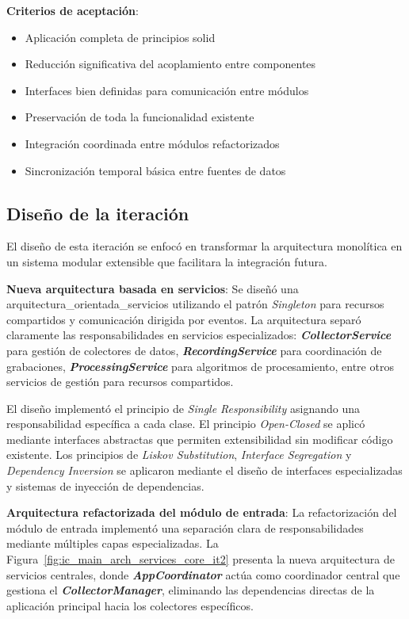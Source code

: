 \textbf{Criterios de aceptación}:
\begin{itemize}
    \item Aplicación completa de principios \acrshort{solid}
    \item Reducción significativa del acoplamiento entre componentes
    \item Interfaces bien definidas para comunicación entre módulos
    \item Preservación de toda la funcionalidad existente
    \item Integración coordinada entre módulos refactorizados
    \item Sincronización temporal básica entre fuentes de datos
\end{itemize}

\subsection{Diseño de la iteración}
\label{subsec:diseno_iteracion_2}

El diseño de esta iteración se enfocó en transformar la arquitectura monolítica en un sistema modular extensible que facilitara la integración futura.

\textbf{Nueva arquitectura basada en servicios}:
Se diseñó una \gls{arquitectura_orientada_servicios} utilizando el patrón \textit{Singleton} para recursos compartidos y comunicación dirigida por eventos. La arquitectura separó claramente las responsabilidades en servicios especializados: \textit{\textbf{CollectorService}} para gestión de colectores de datos, \textit{\textbf{RecordingService}} para coordinación de grabaciones, \textit{\textbf{ProcessingService}} para algoritmos de procesamiento, entre otros servicios de gestión para recursos compartidos.

El diseño implementó el principio de \textit{Single Responsibility} asignando una responsabilidad específica a cada clase. El principio \textit{Open-Closed} se aplicó mediante interfaces abstractas que permiten extensibilidad sin modificar código existente. Los principios de \textit{Liskov Substitution}, \textit{Interface Segregation} y \textit{Dependency Inversion} se aplicaron mediante el diseño de \glspl{interface} especializadas y sistemas de inyección de dependencias.

\textbf{Arquitectura refactorizada del módulo de entrada}:
La refactorización del módulo de entrada implementó una separación clara de responsabilidades mediante múltiples capas especializadas. La Figura~\ref{fig:ic_main_arch_services_core_it2} presenta la nueva arquitectura de servicios centrales, donde \textit{\textbf{AppCoordinator}} actúa como coordinador central que gestiona el \textit{\textbf{CollectorManager}}, eliminando las dependencias directas de la aplicación principal hacia los colectores específicos.

